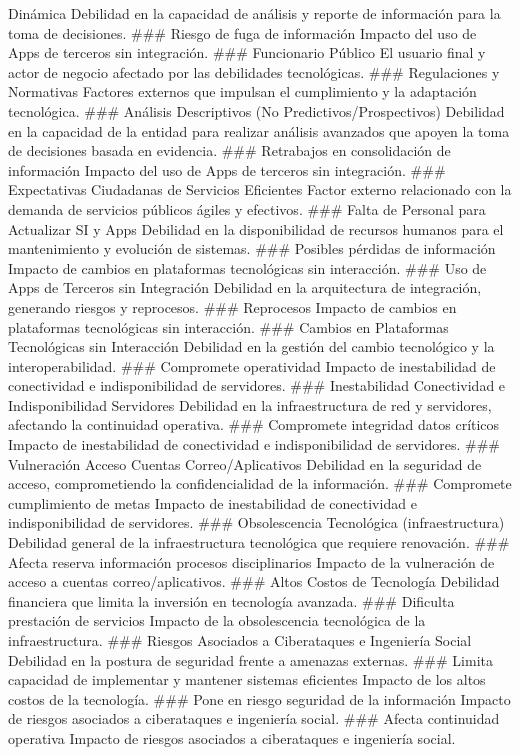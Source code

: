 \documentclass[
	a4paper, %
	12pt, %
]{include/CSSullivanBusinessReport}
\begin{document}
Dinámica Debilidad en la capacidad de análisis y reporte de información
para la toma de decisiones. \#\#\# Riesgo de fuga de información Impacto
del uso de Apps de terceros sin integración. \#\#\# Funcionario Público
El usuario final y actor de negocio afectado por las debilidades
tecnológicas. \#\#\# Regulaciones y Normativas Factores externos que
impulsan el cumplimiento y la adaptación tecnológica. \#\#\# Análisis
Descriptivos (No Predictivos/Prospectivos) Debilidad en la capacidad de
la entidad para realizar análisis avanzados que apoyen la toma de
decisiones basada en evidencia. \#\#\# Retrabajos en consolidación de
información Impacto del uso de Apps de terceros sin integración. \#\#\#
Expectativas Ciudadanas de Servicios Eficientes Factor externo
relacionado con la demanda de servicios públicos ágiles y efectivos.
\#\#\# Falta de Personal para Actualizar SI y Apps Debilidad en la
disponibilidad de recursos humanos para el mantenimiento y evolución de
sistemas. \#\#\# Posibles pérdidas de información Impacto de cambios en
plataformas tecnológicas sin interacción. \#\#\# Uso de Apps de Terceros
sin Integración Debilidad en la arquitectura de integración, generando
riesgos y reprocesos. \#\#\# Reprocesos Impacto de cambios en
plataformas tecnológicas sin interacción. \#\#\# Cambios en Plataformas
Tecnológicas sin Interacción Debilidad en la gestión del cambio
tecnológico y la interoperabilidad. \#\#\# Compromete operatividad
Impacto de inestabilidad de conectividad e indisponibilidad de
servidores. \#\#\# Inestabilidad Conectividad e Indisponibilidad
Servidores Debilidad en la infraestructura de red y servidores,
afectando la continuidad operativa. \#\#\# Compromete integridad datos
críticos Impacto de inestabilidad de conectividad e indisponibilidad de
servidores. \#\#\# Vulneración Acceso Cuentas Correo/Aplicativos
Debilidad en la seguridad de acceso, comprometiendo la confidencialidad
de la información. \#\#\# Compromete cumplimiento de metas Impacto de
inestabilidad de conectividad e indisponibilidad de servidores. \#\#\#
Obsolescencia Tecnológica (infraestructura) Debilidad general de la
infraestructura tecnológica que requiere renovación. \#\#\# Afecta
reserva información procesos disciplinarios Impacto de la vulneración de
acceso a cuentas correo/aplicativos. \#\#\# Altos Costos de Tecnología
Debilidad financiera que limita la inversión en tecnología avanzada.
\#\#\# Dificulta prestación de servicios Impacto de la obsolescencia
tecnológica de la infraestructura. \#\#\# Riesgos Asociados a
Ciberataques e Ingeniería Social Debilidad en la postura de seguridad
frente a amenazas externas. \#\#\# Limita capacidad de implementar y
mantener sistemas eficientes Impacto de los altos costos de la
tecnología. \#\#\# Pone en riesgo seguridad de la información Impacto de
riesgos asociados a ciberataques e ingeniería social. \#\#\# Afecta
continuidad operativa Impacto de riesgos asociados a ciberataques e
ingeniería social.
\end{document}
